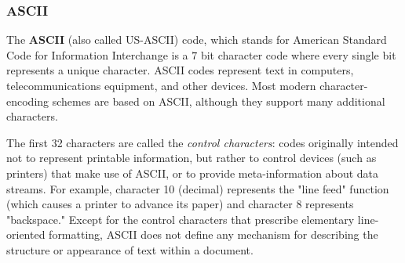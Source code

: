 \documentclass{article}
\begin{document}
  \subsubsection{ASCII}

  The \textbf{ASCII} (also called US-ASCII) code, which stands for American Standard Code for Information Interchange is a $7$ bit character code where every single bit represents a unique character. ASCII codes represent text in computers, telecommunications equipment, and other devices. Most modern character-encoding schemes are based on ASCII, although they support many additional characters.

  The first 32 characters are called the \textit{control characters}: codes originally intended not to represent printable information, but rather to control devices (such as printers) that make use of ASCII, or to provide meta-information about data streams. For example, character 10 (decimal) represents the "line feed" function (which causes a printer to advance its paper) and character 8 represents "backspace." Except for the control characters that prescribe elementary line-oriented formatting, ASCII does not define any mechanism for describing the structure or appearance of text within a document. 
\end{document}
